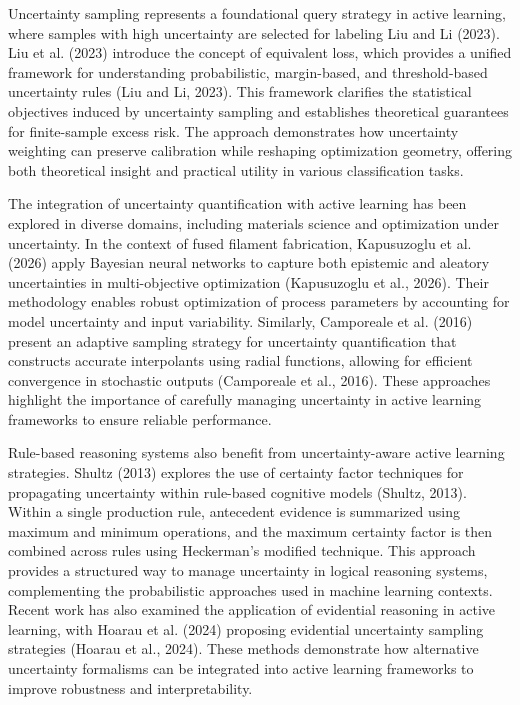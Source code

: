 Uncertainty sampling represents a foundational query strategy in active learning, where samples with high uncertainty are selected for labeling Liu and Li (2023). Liu et al. (2023) introduce the concept of equivalent loss, which provides a unified framework for understanding probabilistic, margin-based, and threshold-based uncertainty rules (Liu and Li, 2023). This framework clarifies the statistical objectives induced by uncertainty sampling and establishes theoretical guarantees for finite-sample excess risk. The approach demonstrates how uncertainty weighting can preserve calibration while reshaping optimization geometry, offering both theoretical insight and practical utility in various classification tasks.

The integration of uncertainty quantification with active learning has been explored in diverse domains, including materials science and optimization under uncertainty. In the context of fused filament fabrication, Kapusuzoglu et al. (2026) apply Bayesian neural networks to capture both epistemic and aleatory uncertainties in multi-objective optimization (Kapusuzoglu et al., 2026). Their methodology enables robust optimization of process parameters by accounting for model uncertainty and input variability. Similarly, Camporeale et al. (2016) present an adaptive sampling strategy for uncertainty quantification that constructs accurate interpolants using radial functions, allowing for efficient convergence in stochastic outputs (Camporeale et al., 2016). These approaches highlight the importance of carefully managing uncertainty in active learning frameworks to ensure reliable performance.

Rule-based reasoning systems also benefit from uncertainty-aware active learning strategies. Shultz (2013) explores the use of certainty factor techniques for propagating uncertainty within rule-based cognitive models (Shultz, 2013). Within a single production rule, antecedent evidence is summarized using maximum and minimum operations, and the maximum certainty factor is then combined across rules using Heckerman's modified technique. This approach provides a structured way to manage uncertainty in logical reasoning systems, complementing the probabilistic approaches used in machine learning contexts. Recent work has also examined the application of evidential reasoning in active learning, with Hoarau et al. (2024) proposing evidential uncertainty sampling strategies (Hoarau et al., 2024). These methods demonstrate how alternative uncertainty formalisms can be integrated into active learning frameworks to improve robustness and interpretability.

